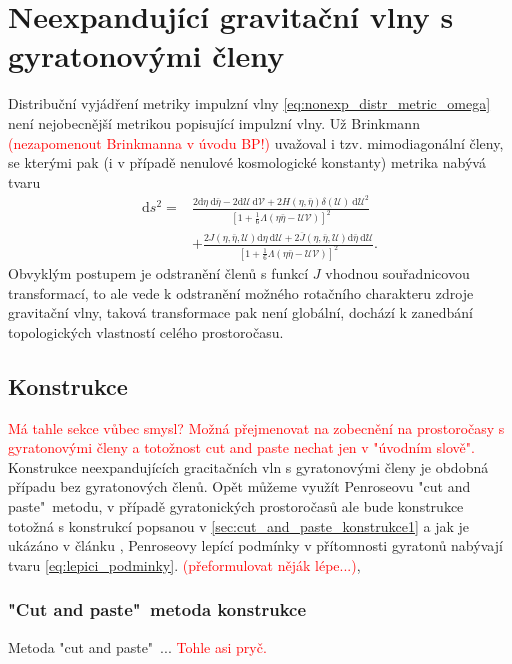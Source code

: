 \chapter{Neexpandující gravitační vlny s gyratonovými členy}
Distribuční vyjádření metriky impulzní vlny \eqref{eq:nonexp_distr_metric_omega} není nejobecnější metrikou popisující
impulzní vlny. Už Brinkmann \textcolor{red}{(nezapomenout Brinkmanna v úvodu BP!)} uvažoval i tzv. mimodiagonální členy, se kterými pak (i v případě nenulové kosmologické konstanty)
metrika nabývá tvaru
\begin{equation}
    \label{eq:nonexp_gyra_distrib_metric_omega}
    \begin{split}
        \mathrm{d}s^2=&\frac{2\mathrm{d}\eta~\mathrm{d}\bar{\eta} - 2 \mathrm{d}\mathcal{U}~\mathrm{d}\mathcal{V} + 2H(\eta, \bar{\eta}) \delta(\mathcal{U}) 
        ~\mathrm{d}\mathcal{U}^2}{\left[1+\frac{1}{6}\Lambda(\eta \bar{\eta}-\mathcal{U}\mathcal{V})\right]^2} \\
        &+ \frac{2J\left(\eta, \bar{\eta}, \mathcal{U}\right) \mathrm{d}\eta~\mathrm{d}\mathcal{U}
        +2\overline{J}\left(\eta, \bar{\eta}, \mathcal{U}\right) \mathrm{d}\bar{\eta}~\mathrm{d}\mathcal{U}}{\left[1+\frac{1}{6}\Lambda(\eta \bar{\eta}-\mathcal{U}\mathcal{V})\right]^2}.
    \end{split}
\end{equation}
Obvyklým postupem je odstranění členů s funkcí $J$ vhodnou souřadnicovou transformací, to ale vede k odstranění
možného rotačního charakteru zdroje gravitační vlny, taková transformace pak není globální, dochází k
zanedbání topologických vlastností celého prostoročasu.

\section{Konstrukce}
\textcolor{red}{Má tahle sekce vůbec smysl? Možná přejmenovat na zobecnění na prostoročasy s gyratonovými členy a 
totožnost cut and paste nechat jen v "úvodním slově".}
Konstrukce neexpandujících gracitačních vln s gyratonovými členy je obdobná případu bez gyratonových
členů. Opět můžeme využít Penroseovu "cut and paste"\ metodu, v případě gyratonických prostoročasů ale bude
konstrukce totožná s konstrukcí popsanou v \eqref{sec:cut_and_paste_konstrukce1} a jak je ukázáno v článku \cite{Podolsky_2017}, Penroseovy lepící podmínky 
v přítomnosti gyratonů nabývají tvaru \eqref{eq:lepici_podminky}. \textcolor{red}{(přeformulovat něják lépe...)},

\subsection{"Cut and paste"\ metoda konstrukce}
Metoda "cut and paste"\ ... \textcolor{red}{Tohle asi pryč.}
